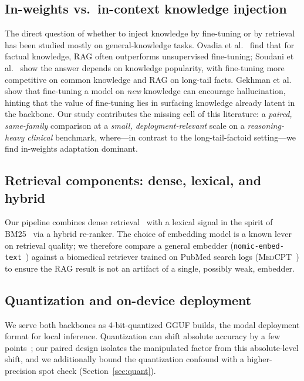 \documentclass[11pt,a4paper]{article}
\begin{document}
\subsection{In-weights vs.\ in-context knowledge injection}
The direct question of whether to inject knowledge by fine-tuning or by retrieval
has been studied mostly on general-knowledge tasks. Ovadia et
al.~\cite{ovadia2024finetuningvsrag} find that for factual knowledge, RAG often
outperforms unsupervised fine-tuning; Soudani et
al.~\cite{soudani2024finetuningvsrag} show the answer depends on knowledge
popularity, with fine-tuning more competitive on common knowledge and RAG on
long-tail facts. Gekhman et al.~\cite{gekhman2024hallucinations} show that
fine-tuning a model on \emph{new} knowledge can encourage hallucination, hinting
that the value of fine-tuning lies in surfacing knowledge already latent in the
backbone. Our study contributes the missing cell of this literature: a
\emph{paired, same-family} comparison at a \emph{small, deployment-relevant}
scale on a \emph{reasoning-heavy clinical} benchmark, where---in contrast to the
long-tail-factoid setting---we find in-weights adaptation dominant.

\subsection{Retrieval components: dense, lexical, and hybrid}
Our pipeline combines dense retrieval~\cite{karpukhin2020dpr} with a lexical
signal in the spirit of BM25~\cite{robertson2009bm25} via a hybrid re-ranker. The
choice of embedding model is a known lever on retrieval quality; we therefore
compare a general embedder (\texttt{nomic-embed-text}~\cite{nomic2024embed})
against a biomedical retriever trained on PubMed search logs
(\textsc{MedCPT}~\cite{jin2023medcpt}) to ensure the RAG result is not an artifact
of a single, possibly weak, embedder.

\subsection{Quantization and on-device deployment}
We serve both backbones as 4-bit-quantized GGUF builds, the modal deployment
format for local inference. Quantization can shift absolute accuracy by a few
points~\cite{dettmers2023qlora}; our paired design isolates the manipulated
factor from this absolute-level shift, and we additionally bound the quantization
confound with a higher-precision spot check (Section~\ref{sec:quant}).
\end{document}
